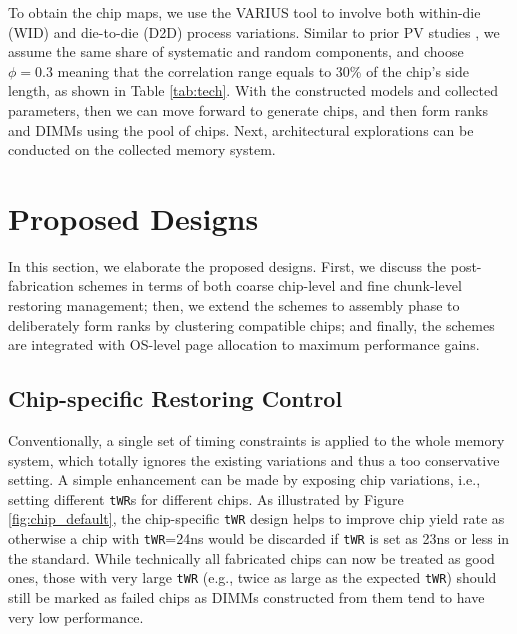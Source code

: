 To obtain the chip maps, we use the VARIUS tool \cite{SM08:varius} to involve both within-die (WID) and die-to-die (D2D) process variations. 
Similar to prior PV studies \cite{ICICDT:weight,HPCA14:mosaic}, we assume the same share of systematic and random components, and choose $\phi=0.3$ meaning that the correlation range equals to 30\% of the chip's side length, as shown in Table \ref{tab:tech}. 
With the constructed models and collected parameters, then we can move forward to generate chips, and then form ranks and DIMMs using the pool of chips. Next, architectural explorations can be conducted on the collected memory system. 

\section{Proposed Designs}
In this section, we elaborate the proposed designs. First, we discuss the post-fabrication schemes in terms of both coarse chip-level and fine chunk-level restoring management; then, we extend the schemes to assembly phase to deliberately form ranks by clustering compatible chips; and finally, the schemes are integrated with OS-level page allocation to maximum performance gains.

\subsection{Chip-specific Restoring Control}
Conventionally, a single set of timing constraints is applied to the whole memory system, which totally ignores the existing variations and thus a too conservative setting.
A simple enhancement can be made by exposing chip variations, i.e., setting different {\tt tWR}s for different chips. 
As illustrated by Figure \ref{fig:chip_default}, the chip-specific {\tt tWR} design helps to improve chip yield rate as otherwise a chip with {\tt tWR}=24ns would be discarded if {\tt tWR} is set as 23ns or less in the standard.  While technically all fabricated chips can now be treated as good ones, those with very large {\tt tWR} (e.g., twice as large as the expected {\tt tWR}) should still be marked as failed chips as DIMMs constructed from them tend to have very low performance. 

